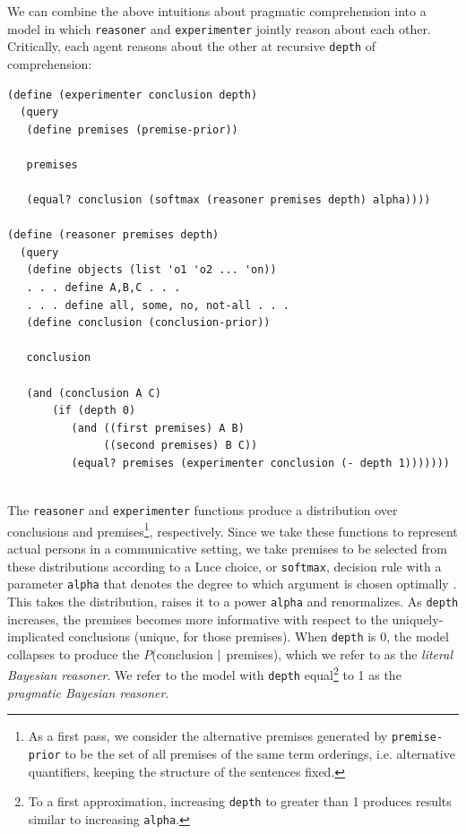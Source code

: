 \documentclass[10pt,letterpaper]{article}
\begin{document}
We can combine the above intuitions about pragmatic comprehension into a model in which \lstinline{reasoner} and \lstinline{experimenter} jointly reason about each other. Critically, each agent reasons about the other at recursive \lstinline{depth} of comprehension:
\begin{lstlisting}
(define (experimenter conclusion depth)
  (query 
   (define premises (premise-prior))
   
   premises
   
   (equal? conclusion (softmax (reasoner premises depth) alpha))))

(define (reasoner premises depth)
  (query 
   (define objects (list 'o1 'o2 ... 'on)) 
   . . . define A,B,C . . . 
   . . . define all, some, no, not-all . . .
   (define conclusion (conclusion-prior))
   
   conclusion
   
   (and (conclusion A C)
	   (if (depth 0)
          (and ((first premises) A B)
               ((second premises) B C))
          (equal? premises (experimenter conclusion (- depth 1)))))))
            
\end{lstlisting}
The \lstinline{reasoner} and \lstinline{experimenter} functions produce a distribution over conclusions and premises\footnote{As a first pass, we consider the alternative premises generated by \lstinline{premise-prior} to be the set of all premises of the same term orderings, i.e. alternative quantifiers, keeping the structure of the sentences fixed.}, respectively. Since we take these functions to represent actual persons in a communicative setting, we take premises to be selected from these distributions according to a Luce choice, or \lstinline{softmax}, decision rule with a parameter \lstinline{alpha} that denotes the degree to which argument is chosen optimally \cite{luce1959}. This takes the distribution, raises it to a power \lstinline{alpha} and renormalizes. As \lstinline{depth} increases, the premises becomes more informative with respect to the uniquely-implicated conclusions (unique, for those premises). When \lstinline{depth} is 0, the model collapses to produce the $P$(conclusion $\arrowvert$ premises), which we refer to as the \emph{literal Bayesian reasoner}. We refer to the model with \lstinline{depth} equal\footnote{To a first approximation, increasing \lstinline{depth} to greater than 1 produces results  similar to increasing \lstinline{alpha}.} to 1 as the \emph{pragmatic Bayesian reasoner}. 
\end{document}
